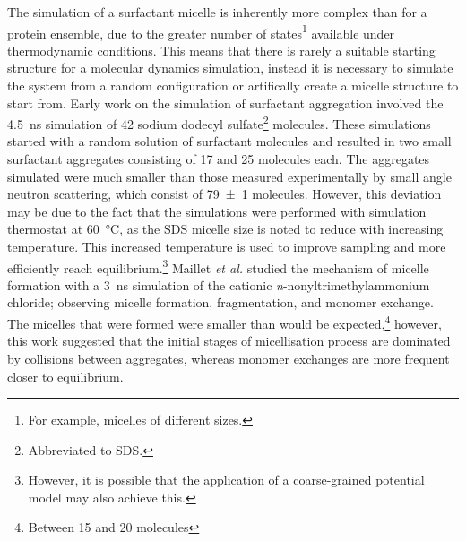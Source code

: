 The simulation of a surfactant micelle is inherently more complex than for a protein ensemble, due to the greater number of states\footnote{For example, micelles of different sizes.} available under thermodynamic conditions.
This means that there is rarely a suitable starting structure for a molecular dynamics simulation, instead it is necessary to simulate the system from a random configuration or artifically create a micelle structure to start from.
Early work on the simulation of surfactant aggregation involved the \SI{4.5}{\nano\second} simulation of 42 sodium dodecyl sulfate\footnote{Abbreviated to SDS.} molecules.\autocite{tarek_molecular_1998}
These simulations started with a random solution of surfactant molecules and resulted in two small surfactant aggregates consisting of 17 and 25 molecules each.
The aggregates simulated were much smaller than those measured experimentally by small angle neutron scattering, which consist of \num{79\pm1} molecules.\autocite{hassan_small_2003}
However, this deviation may be due to the fact that the simulations were performed with simulation thermostat at \SI{60}{\celsius}, as the SDS micelle size is noted to reduce with increasing temperature.\autocite{hayashi_micelle_1980}
This increased temperature is used to improve sampling and more efficiently reach equilibrium.\footnote{However, it is possible that the application of a coarse-grained potential model may also achieve this.}
Maillet \emph{et al.} studied the mechanism of micelle formation with a \SI{3}{\nano\second} simulation of the cationic \emph{n}-nonyltrimethylammonium chloride; observing micelle formation, fragmentation, and monomer exchange.\autocite{maillet_large_1999}
The micelles that were formed were smaller than would be expected,\footnote{Between 15 and 20 molecules} however, this work suggested that the initial stages of micellisation process are dominated by collisions between aggregates, whereas monomer exchanges are more frequent closer to equilibrium.

